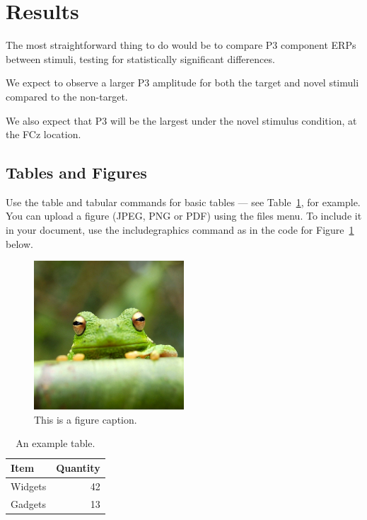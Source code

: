\documentclass[a4paper,man,natbib]{apa6}
\begin{document}
\section{Results}

The most straightforward thing to do would be to compare P3 component ERPs between stimuli, testing for statistically significant differences. 

We expect to observe a larger P3 amplitude for both the target and novel stimuli compared to the non-target. 

We also expect that P3 will be the largest under the novel stimulus condition, at the FCz location.







\subsection{Tables and Figures}

Use the table and tabular commands for basic tables --- see Table~\ref{tab:widgets}, for example. You can upload a figure (JPEG, PNG or PDF) using the files menu. To include it in your document, use the includegraphics command as in the code for Figure~\ref{fig:frog} below.

\begin{figure}
\centering
\includegraphics[width=0.5\textwidth]{frog.jpg}
\caption{\label{fig:frog}This is a figure caption.}
\end{figure}

\begin{table}
\centering
\begin{tabular}{l|r}
Item & Quantity \\\hline
Widgets & 42 \\
Gadgets & 13
\end{tabular}
\caption{\label{tab:widgets}An example table.}
\end{table}
\end{document}
